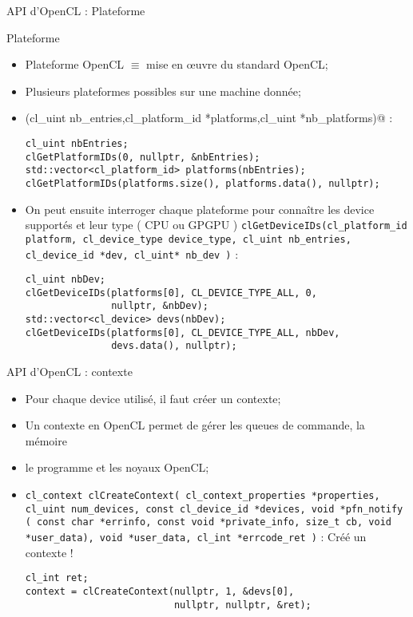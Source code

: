\documentclass[handout,francais]{beamer}
\begin{document}
\begin{frame}[fragile]{API d'OpenCL : Plateforme}

{\scriptsize
\begin{block}{Plateforme}
\begin{itemize}
\item Plateforme OpenCL $\equiv$ mise en {\oe}uvre du standard OpenCL;
\item Plusieurs plateformes possibles sur une machine donnée;
\item \lstinline@clGetPlatformIDs(cl_uint nb_entries,cl_platform_id *platforms,cl_uint *nb_platforms)@ :
\begin{lstlisting}
cl_uint nbEntries;
clGetPlatformIDs(0, nullptr, &nbEntries);
std::vector<cl_platform_id> platforms(nbEntries);
clGetPlatformIDs(platforms.size(), platforms.data(), nullptr);
\end{lstlisting}
\item On peut ensuite interroger chaque plateforme pour connaître les
device supportés et leur type ( CPU ou GPGPU )
\texttt{clGetDeviceIDs(cl\_platform\_id platform, cl\_device\_type device\_type, cl\_uint nb\_entries, cl\_device\_id *dev, cl\_uint* nb\_dev )} :
\begin{lstlisting}
cl_uint nbDev;
clGetDeviceIDs(platforms[0], CL_DEVICE_TYPE_ALL, 0, 
               nullptr, &nbDev);
std::vector<cl_device> devs(nbDev);
clGetDeviceIDs(platforms[0], CL_DEVICE_TYPE_ALL, nbDev, 
               devs.data(), nullptr);
\end{lstlisting}
\end{itemize}
\end{block}
}
\end{frame}

\begin{frame}[fragile]{API d'OpenCL : contexte}

\begin{itemize}
\item Pour chaque device utilisé, il faut créer un contexte;
\item Un contexte en OpenCL permet de gérer les queues de commande, la mémoire
\item le programme et les noyaux OpenCL;
\item \texttt{cl\_context clCreateContext( 	cl\_context\_properties *properties,
cl\_uint num\_devices, const cl\_device\_id *devices,
void *pfn\_notify ( const char *errinfo, const void *private\_info, 
size\_t cb, void *user\_data), void *user\_data, cl\_int *errcode\_ret )} : Créé
un contexte !

\begin{lstlisting}
cl_int ret;
context = clCreateContext(nullptr, 1, &devs[0], 
                          nullptr, nullptr, &ret);
\end{lstlisting}
\end{itemize}
\end{frame}
\end{document}

